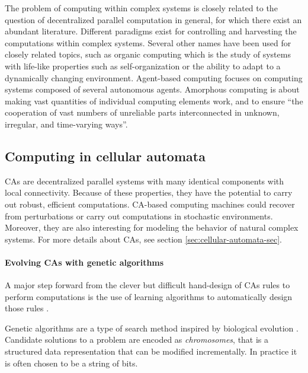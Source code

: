 The problem of computing within complex systems is closely related to the
question of decentralized parallel computation in general, for which there exist
an abundant literature. Different paradigms exist for controlling and harvesting
the computations within complex systems. Several other names have been used for
closely related topics, such as organic computing
\parencite{muller-schloerOrganicComputingParadigm2011} which is the study of
systems with life-like properties such as self-organization or the ability to
adapt to a dynamically changing environment. Agent-based computing
\parencite{jenningsAgentBasedComputingPromise1999} focuses on computing systems
composed of several autonomous agents. Amorphous computing
\parencite{abelsonAmorphousComputing2000,
  nagpalProgrammablePatternFormationScaleIndependence2008,
  nagpalProgrammableSelfassemblyUsing2002} is about making vast quantities of
individual computing elements work, and to ensure ``the cooperation of vast
numbers of unreliable parts interconnected in unknown, irregular, and
time-varying ways''.

\subsection{Computing in cellular automata}

\Acfp{CA} are decentralized parallel systems with many identical components with
local connectivity. Because of these properties, they have the potential to
carry out robust, efficient computations. \ac{CA}-based computing machines could
recover from perturbations or carry out computations in stochastic environments.
Moreover, they are also interesting for modeling the behavior of natural complex
systems. For more details about \acp{CA}, see section
\ref{sec:cellular-automata-sec}.

\paragraph{Evolving \acp{CA} with genetic algorithms}
A major step forward from the clever but difficult hand-design of \acp{CA} rules
to perform computations is the use of learning algorithms to automatically
design those rules \parencite{mitchellEvolvingCellularAutomata1996}.

Genetic algorithms are a type of search method inspired by biological evolution
\parencite{bookerClassifierSystemsGenetic1989}. Candidate solutions to a problem
are encoded as \emph{chromosomes}, that is a structured data representation that
can be modified incrementally. In practice it is often chosen to be a string of
bits.


